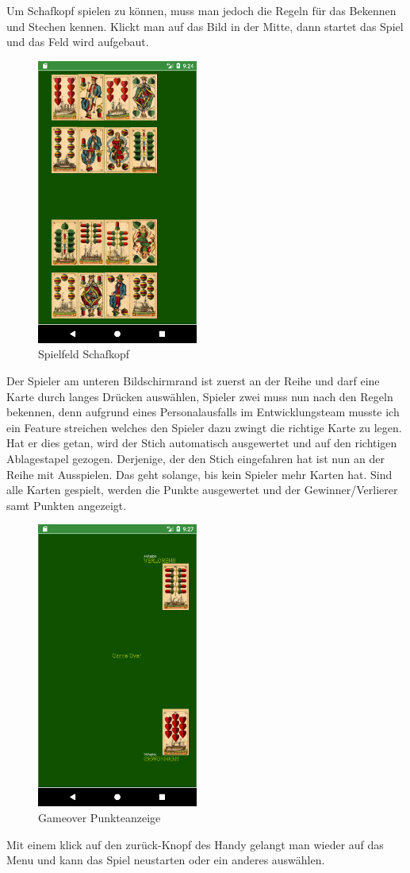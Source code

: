 Um Schafkopf spielen zu können, muss man jedoch die Regeln für das Bekennen und Stechen kennen. Klickt man auf das Bild in der Mitte, dann startet das Spiel und  das Feld wird aufgebaut. 
\begin{figure}[h]
	\centering
	\includegraphics{resources/kartenscreens/board}
	\caption{Spielfeld Schafkopf}
\end{figure}
Der Spieler am unteren Bildschirmrand ist zuerst an der Reihe und darf eine Karte durch langes Drücken auswählen, Spieler zwei muss nun nach den Regeln bekennen, denn aufgrund eines Personalausfalls im Entwicklungsteam musste ich ein Feature streichen welches den Spieler dazu zwingt die richtige Karte zu legen. Hat er dies getan, wird der Stich automatisch ausgewertet und auf den richtigen Ablagestapel gezogen. Derjenige, der den Stich eingefahren hat ist nun an der Reihe mit Ausspielen. Das geht solange, bis kein Spieler mehr Karten hat. Sind alle Karten gespielt, werden die Punkte ausgewertet und der Gewinner/Verlierer samt Punkten angezeigt.
\begin{figure}[h]
	\centering
	\includegraphics{resources/kartenscreens/gameover}
	\caption{Gameover Punkteanzeige}
\end{figure}
Mit einem klick auf den zurück-Knopf des Handy gelangt man wieder auf das Menu und kann das Spiel neustarten oder ein anderes auswählen.